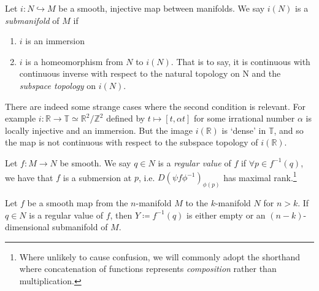 \documentclass[fleqn, 11pt]{report}
\begin{document}
\begin{definition}
	Let $ i: N \hookrightarrow M $ be a smooth, injective map between manifolds. We say $ i(N) $ is a \textsl{submanifold} of $ M $ if
		\begin{enumerate}
			\item $ i $ is an immersion
			\item $ i $ is a homeomorphism from $ N $ to $ i(N) $. That is to say, it is continuous with continuous inverse with respect to the natural topology on N and the \textit{subspace topology} on $ i(N) $.
		\end{enumerate}
\end{definition}
\begin{remark}
	There are indeed some strange cases where the second condition is relevant. For example $ i: \mathbb{R} \to \mathbb{T} \simeq \mathbb{R}^2/ \mathbb{Z}^2 $ defined by $ t \mapsto [t,\alpha t] $ for some irrational number $ \alpha $ is locally injective and an immersion. But the image $ i(\mathbb{R}) $ is `dense' in $ \mathbb{T} $, and so the map is not continuous with respect to the subspace topology of $ i(\mathbb{R}) $.
\end{remark}

\begin{definition}
	Let $ f: M \to N $ be smooth. We say $ q \in N $ is a \textsl{regular value} of $ f $ if $ \forall p \in f^{-1}(q) $, we have that $ f $ is a submersion at $ p $, i.e. $ D(\psi f \phi^{-1})_{\phi(p)} $ has maximal rank.\footnote{Where unlikely to cause confusion, we will commonly adopt the shorthand where concatenation of functions represents \textit{composition} rather than multiplication.}
\end{definition}


\begin{theorem}
	Let $ f $ be a smooth map from the $ n $-manifold $ M $ to the $ k $-manifold $ N $ for $ n > k $. If $ q \in N $ is a regular value of $ f $, then $ Y \coloneqq f^{-1}(q) $ is either empty or an $ (n-k) $-dimensional submanifold of $ M $.
\end{theorem}

\end{document}
